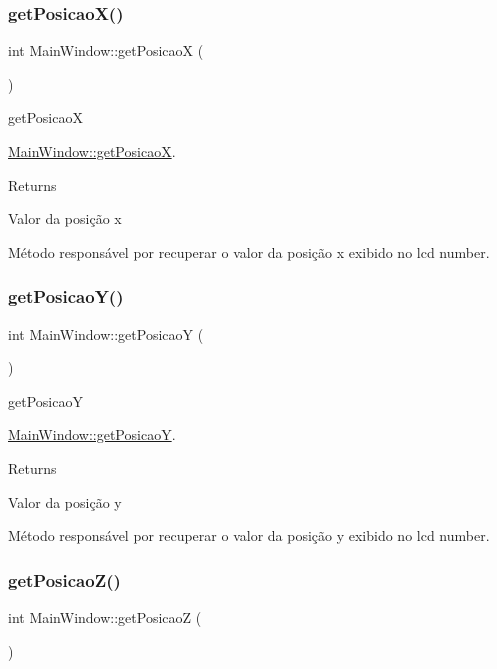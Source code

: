 \subsubsection{\texorpdfstring{getPosicaoX()}{getPosicaoX()}}
{\footnotesize\ttfamily int Main\+Window\+::get\+PosicaoX (\begin{DoxyParamCaption}{ }\end{DoxyParamCaption})}



get\+PosicaoX 

\mbox{\hyperlink{classMainWindow_a90c9a234855070a1629ee1b85cabb7d0}{Main\+Window\+::get\+PosicaoX}}.

\begin{DoxyReturn}{Returns}


Valor da posição x
\end{DoxyReturn}
Método responsável por recuperar o valor da posição x exibido no lcd number. \mbox{\label{classMainWindow_a79dd8ed86b37fd50a4f15293960adf16}} 
\subsubsection{\texorpdfstring{getPosicaoY()}{getPosicaoY()}}
{\footnotesize\ttfamily int Main\+Window\+::get\+PosicaoY (\begin{DoxyParamCaption}{ }\end{DoxyParamCaption})}



get\+PosicaoY 

\mbox{\hyperlink{classMainWindow_a79dd8ed86b37fd50a4f15293960adf16}{Main\+Window\+::get\+PosicaoY}}.

\begin{DoxyReturn}{Returns}


Valor da posição y
\end{DoxyReturn}
Método responsável por recuperar o valor da posição y exibido no lcd number. \mbox{\label{classMainWindow_a91cc6b0f1be1fae34eae724789370906}} 
\subsubsection{\texorpdfstring{getPosicaoZ()}{getPosicaoZ()}}
{\footnotesize\ttfamily int Main\+Window\+::get\+PosicaoZ (\begin{DoxyParamCaption}{ }\end{DoxyParamCaption})}




